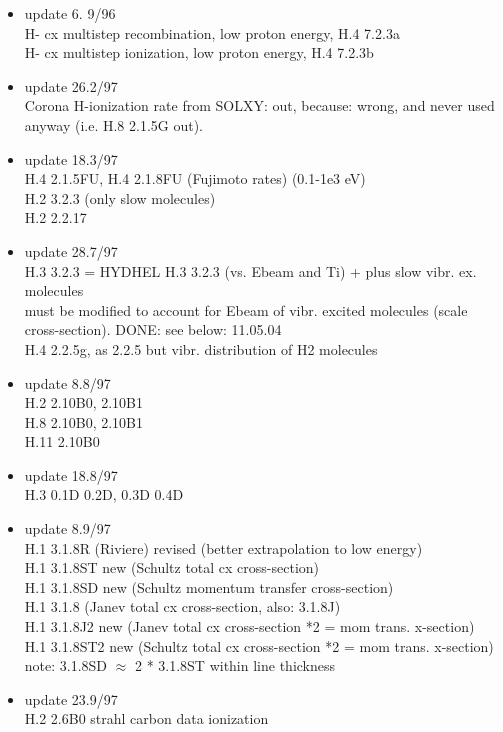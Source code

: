 \documentclass[12pt,dvipdfmx]{article}
\begin{document}
\begin{itemize}
 \item update   6. 9/96 \\
   H- cx multistep recombination, low proton energy, H.4  7.2.3a\\
   H- cx multistep ionization, low proton energy, H.4  7.2.3b
 \item update   26.2/97 \\
   Corona H-ionization rate from SOLXY: out, because:
   wrong, and never used anyway
(i.e. H.8 2.1.5G out).
 \item update   18.3/97 \\
  H.4 2.1.5FU, H.4 2.1.8FU (Fujimoto rates) (0.1-1e3 eV) \\
  H.2 3.2.3  (only slow molecules) \\
  H.2 2.2.17
 \item update   28.7/97 \\
  H.3 3.2.3  = HYDHEL H.3 3.2.3 (vs. Ebeam and Ti) + plus
  slow vibr. ex. molecules\\
  must be modified to account for Ebeam of vibr. excited
  molecules (scale cross-section). DONE: see below: 11.05.04\\
  H.4 2.2.5g, as 2.2.5 but vibr. distribution of H2 molecules
 \item update    8.8/97 \\
  H.2 2.10B0, 2.10B1 \\
  H.8 2.10B0, 2.10B1 \\
  H.11 2.10B0
 \item update   18.8/97 \\
  H.3 0.1D  0.2D, 0.3D 0.4D \\
 \item update    8.9/97 \\
  H.1 3.1.8R (Riviere) revised (better extrapolation to low energy) \\
  H.1 3.1.8ST new (Schultz total cx cross-section) \\
  H.1 3.1.8SD new (Schultz momentum transfer cross-section) \\
  H.1 3.1.8       (Janev total cx cross-section, also: 3.1.8J)\\
  H.1 3.1.8J2 new (Janev total cx cross-section *2 = mom trans. x-section)\\
  H.1 3.1.8ST2 new (Schultz total cx cross-section *2 = mom trans. x-section)\\
  note: 3.1.8SD $\approx$ 2  * 3.1.8ST within line thickness
 \item update   23.9/97 \\
  H.2 2.6B0 strahl carbon data ionization\\

\end{itemize}
\end{document}
